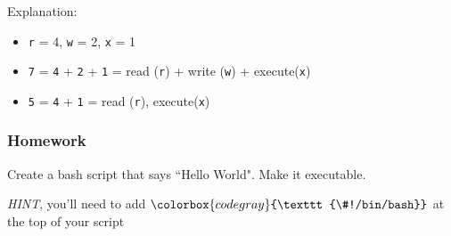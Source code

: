 \documentclass{beamer}
\newcommand{\code}[1]{\colorbox{codegray}{\texttt{#1}}}
\begin{document}
\begin{frame}
\bigskip
Explanation:
\begin{itemize}
    \item \code{r} = 4, \code{w} = 2, \code{x} = 1
    \item \code{7} = \code{4} + \code{2} + \code{1} = read (\code{r}) + write (\code{w}) +  execute(\code{x})
    \item \code{5} = \code{4} + \code{1} = read (\code{r}), execute(\code{x})
\end{itemize}


\end{frame}



%
%


\begin{frame}
\frametitle{Homework}
Create a bash script that says ``Hello World". Make it executable. 

\bigskip

\emph{HINT}, you'll need to add $\code{\#^^21/bin/bash}$ at the top of your script
\end{frame}
\end{document}
